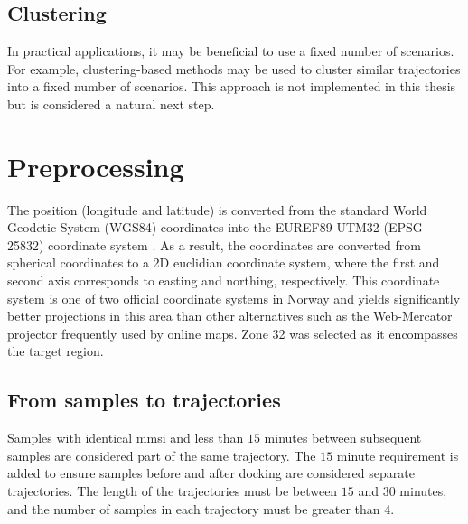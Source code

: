 \subsection{Clustering}
In practical applications, it may be beneficial to use a fixed number of scenarios. For example, clustering-based methods may be used to cluster similar trajectories into a fixed number of scenarios. This approach is not implemented in this thesis but is considered a natural next step.


\section{Preprocessing}
The position (longitude and latitude) is converted from the standard World Geodetic System (WGS84) coordinates into the EUREF89 UTM32 (EPSG-25832) coordinate system \cite{kartverket}.  As a result, the coordinates are converted from spherical coordinates to a 2D euclidian coordinate system, where the first and second axis corresponds to easting and northing, respectively. This coordinate system is one of two official coordinate systems in Norway and yields significantly better projections in this area than other alternatives such as the Web-Mercator projector frequently used by online maps. Zone 32 was selected as it encompasses the target region.

\subsection{From samples to trajectories}\label{sec:from_ais_to_traj}
Samples with identical \acrshort{mmsi} and less than $15$ minutes between subsequent samples are considered part of the same trajectory. The $15$ minute requirement is added to ensure samples before and after docking are considered separate trajectories. The length of the trajectories must be between $15$ and $30$ minutes, and the number of samples in each trajectory must be greater than $4$. 
